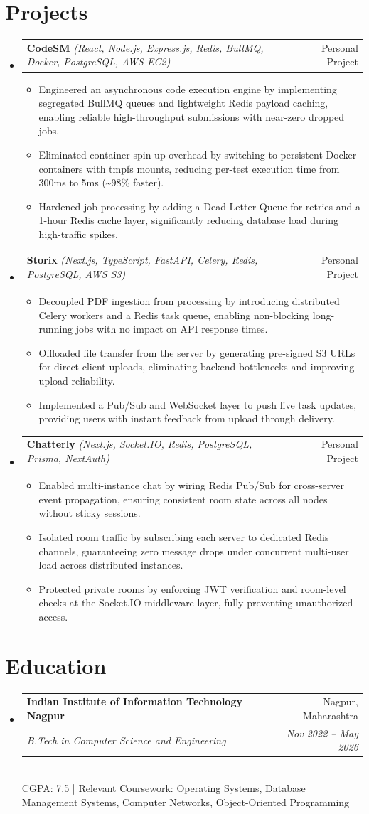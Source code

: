 \documentclass[letterpaper,10pt]{article}
\makeatletter
\newenvironment{resumeList}{
  \begin{itemize}[leftmargin=0.15in, label={}]
}{
  \end{itemize}
}
\newcommand{\resumeItem}[1]{
  \item\small{
    {#1 \vspace{-2.5pt}}
  }
}
\newcommand{\resumeSubheading}[4]{
  \vspace{-2pt}\item
    \begin{tabular*}{0.97\textwidth}[t]{l@{\extracolsep{\fill}}r}
      \textbf{#1} & #2 \\
      \textit{\small#3} & \textit{\small #4} \\
    \end{tabular*}\vspace{-6pt}
}
\newcommand{\resumeProjectHeading}[3]{
  \vspace{-2pt}\item
    \begin{tabular*}{0.97\textwidth}[t]{l@{\extracolsep{\fill}}r}
      \textbf{#1} \textit{\small(#2)} & #3 \\
    \end{tabular*}\vspace{-6pt}
}
\newcommand{\resumeItemListStart}{\begin{itemize}[leftmargin=0.15in]}
\newcommand{\resumeItemListEnd}{\end{itemize}\vspace{-5pt}}
\makeatother
\begin{document}
\section{Projects}
\begin{resumeList}
    \resumeProjectHeading
    {CodeSM}{React, Node.js, Express.js, Redis, BullMQ, Docker, PostgreSQL, AWS EC2}{Personal Project}
  \resumeItemListStart
    \resumeItem{Engineered an asynchronous code execution engine by implementing segregated BullMQ queues and lightweight Redis payload caching, enabling reliable high-throughput submissions with near-zero dropped jobs.}
    \resumeItem{Eliminated container spin-up overhead by switching to persistent Docker containers with tmpfs mounts, reducing per-test execution time from 300ms to 5ms (\textasciitilde{}98\% faster).}
    \resumeItem{Hardened job processing by adding a Dead Letter Queue for retries and a 1-hour Redis cache layer, significantly reducing database load during high-traffic spikes.}
  \resumeItemListEnd

  \resumeProjectHeading
    {Storix}{Next.js, TypeScript, FastAPI, Celery, Redis, PostgreSQL, AWS S3}{Personal Project}
  \resumeItemListStart
    \resumeItem{Decoupled PDF ingestion from processing by introducing distributed Celery workers and a Redis task queue, enabling non-blocking long-running jobs with no impact on API response times.}
    \resumeItem{Offloaded file transfer from the server by generating pre-signed S3 URLs for direct client uploads, eliminating backend bottlenecks and improving upload reliability.}
    \resumeItem{Implemented a Pub/Sub and WebSocket layer to push live task updates, providing users with instant feedback from upload through delivery.}
  \resumeItemListEnd

  \resumeProjectHeading
    {Chatterly}{Next.js, Socket.IO, Redis, PostgreSQL, Prisma, NextAuth}{Personal Project}
  \resumeItemListStart
    \resumeItem{Enabled multi-instance chat by wiring Redis Pub/Sub for cross-server event propagation, ensuring consistent room state across all nodes without sticky sessions.}
    \resumeItem{Isolated room traffic by subscribing each server to dedicated Redis channels, guaranteeing zero message drops under concurrent multi-user load across distributed instances.}
    \resumeItem{Protected private rooms by enforcing JWT verification and room-level checks at the Socket.IO middleware layer, fully preventing unauthorized access.}
  \resumeItemListEnd
\end{resumeList}

\section{Education}
\begin{resumeList}
    \resumeSubheading
    {Indian Institute of Information Technology Nagpur}{Nagpur, Maharashtra}
    {B.Tech in Computer Science and Engineering}{Nov 2022 – May 2026}
    \vspace{2pt}\\
    \small{CGPA: 7.5 | Relevant Coursework: Operating Systems, Database Management Systems, Computer Networks, Object-Oriented Programming}
\end{resumeList}
\end{document}
